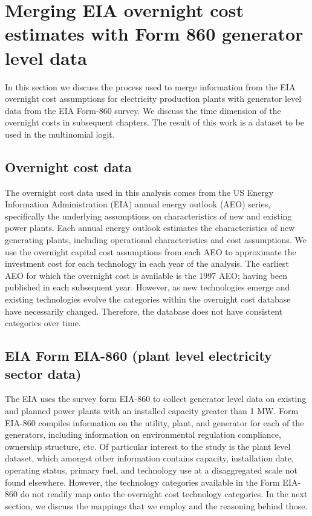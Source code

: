 \documentclass[10pt]{report}
\begin{document}
\chapter{Merging EIA overnight cost estimates with Form 860 generator level data}\label{ch_mapping}
In this section we discuss the process used to merge information from the EIA overnight cost assumptions for electricity production plants with generator level data from the EIA Form-860 survey.  
We discuss the time dimension of the overnight costs in subsequent chapters. 
The result of this work is a dataset to be used in the multinomial logit.

\section{Overnight cost data}
The overnight cost data used in this analysis comes from the US Energy Information Administration (EIA) annual energy outlook (AEO) series, specifically the underlying assumptions on characteristics of new and existing power plants. 
Each annual energy outlook estimates the characteristics of new generating plants, including operational characteristics and cost assumptions.
We use the overnight capital cost assumptions from each AEO to approximate the investment cost for each technology in each year of the analysis.
The earliest AEO for which the overnight cost is available is the 1997 AEO; having been published in each subsequent year.
However, as new technologies emerge and existing technologies evolve the categories within the overnight cost database have necessarily changed. 
Therefore, the database does not have consistent categories over time. 

\section{EIA Form EIA-860 (plant level electricity sector data)}
The EIA uses the survey form EIA-860 to collect generator level data on existing and planned power plants with an installed capacity greater than 1 MW. 
Form EIA-860 compiles information on the utility, plant, and generator for each of the generators, including information on environmental regulation compliance, ownership structure, etc.  
Of particular interest to the study is the plant level dataset, which amongst other information contains capacity, installation date, operating status, primary fuel, and technology use at a disaggregated scale not found elsewhere.
However, the technology categories available in the Form EIA-860 do not readily map onto the overnight cost technology categories. 
In the next section, we discuss the mappings that we employ and the reasoning behind those. 
\end{document}
